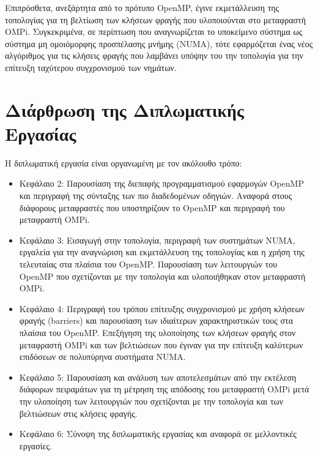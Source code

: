 Επιπρόσθετα, ανεξάρτητα από το πρότυπο OpenMP, έγινε εκμετάλλευση της τοπολογίας για τη βελτίωση των κλήσεων φραγής που υλοποιούνται στο μεταφραστή OMPi. Συγκεκριμένα, σε περίπτωση που αναγνωρίζεται το υποκείμενο σύστημα ως σύστημα μη ομοιόμορφης προσπέλασης μνήμης (NUMA), τότε εφαρμόζεται ένας νέος αλγόριθμος για τις κλήσεις φραγής που λαμβάνει υπόψην του την τοπολογία για την επίτευξη ταχύτερου συγχρονισμού των νημάτων.


\section{Διάρθρωση της Διπλωματικής Εργασίας}
\label{sec:Structure of the Diploma Thesis}
Η διπλωματική εργασία είναι οργανωμένη με τον ακόλουθο τρόπο:
\begin{itemize}
	\item Κεφάλαιο 2: Παρουσίαση της διεπαφής προγραμματισμού εφαρμογών OpenMP και περιγραφή της σύνταξης των πιο διαδεδομένων οδηγιών. %
	Αναφορά στους διάφορους μεταφραστές που υποστηρίζουν το OpenMP και περιγραφή του μεταφραστή OMPi.
	\item Κεφάλαιο 3: Εισαγωγή στην τοπολογία, περιγραφή των συστημάτων NUMA, εργαλεία για την αναγνώριση και εκμετάλλευση της τοπολογίας και η χρήση της τελευταίας στα πλαίσια του OpenMP. Παρουσίαση των λειτουργιών του OpenMP που σχετίζονται με την τοπολογία και υλοποιήθηκαν στον μεταφραστή OMPi.
	\item Κεφάλαιο 4: Περιγραφή του τρόπου επίτευξης συγχρονισμού με χρήση κλήσεων φραγής (barriers) και παρουσίαση των ιδιαίτερων χαρακτηριστικών τους στα πλαίσια του OpenMP. Επεξήγηση της υλοποίησης των κλήσεων φραγής στον μεταφραστή OMPi και των βελτιώσεων που έγιναν για την επίτευξη καλύτερων επιδόσεων σε πολυπύρηνα συστήματα NUMA.
	\item Κεφάλαιο 5: Παρουσίαση και ανάλυση των αποτελεσμάτων από την εκτέλεση διάφορων πειραμάτων για τη μέτρηση της απόδοσης του μεταφραστή OMPi μετά την υλοποίηση των λειτουργιών που σχετίζονται με την τοπολογία και των βελτιώσεων στις κλήσεις φραγής.
	\item Κεφάλαιο 6: Σύνοψη της διπλωματικής εργασίας και αναφορά σε μελλοντικές εργασίες.
\end{itemize}

